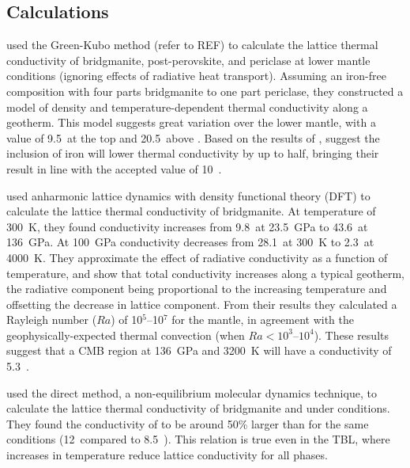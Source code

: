 \subsection{Calculations}

\citet{Haigis2012} used the Green-Kubo method (refer to REF) to calculate the lattice thermal conductivity of bridgmanite, post-perovskite, and periclase at lower mantle conditions (ignoring effects of radiative heat transport). Assuming an iron-free composition with four parts bridgmanite to one part periclase, they constructed a model of density and temperature-dependent thermal conductivity along a geotherm. This model suggests great variation over the lower mantle, with a value of 9.5~\wmks at the top and 20.5~\wmks above \ddd. Based on the results of \citet{Manthilake2011}, \citet{Haigis2012} suggest the inclusion of iron will lower thermal conductivity by up to half, bringing their result in line with the accepted value of 10~\wmk \citep{Lay2006}. %

\citet{Dekura2013} used \ais anharmonic lattice dynamics with density functional theory (DFT) to calculate the lattice thermal conductivity of bridgmanite. At temperature of 300~K, they found conductivity increases from 9.8~\wmks at 23.5~GPa to 43.6~\wmks at 136~GPa. At 100~GPa conductivity decreases from 28.1~\wmks at 300~K to 2.3~\wmks at 4000~K. They approximate the effect of radiative conductivity as a function of temperature, and show that total conductivity increases along a typical geotherm, the radiative component being proportional to the increasing temperature and offsetting the decrease in lattice component. From their results they calculated a Rayleigh number ($Ra$) of 10$^5$--10$^7$ for the mantle, in agreement with the geophysically-expected thermal convection (when $Ra < 10^3$--$10^4$). These results suggest that a CMB region at 136~GPa and 3200~K will have a conductivity of 5.3~\wmk.%

\citet{Ammann2014} used the direct method, a non-equilibrium molecular dynamics technique, to calculate the lattice thermal conductivity of bridgmanite and \ppvs under \ddds conditions. They found the conductivity of \ppvs to be around 50\% larger than \bdg for the same conditions (12~\wmks compared to 8.5~\wmk). This relation is true even in the TBL, where increases in temperature reduce lattice conductivity for all \mgsios phases. %

